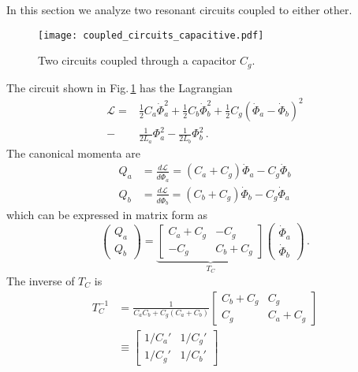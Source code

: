 
In this section we analyze two resonant circuits coupled to either other.


\begin{figure}
\begin{centering}
\texttt{[image: coupled\_circuits\_capacitive.pdf]}
\par\end{centering}
\caption{Two circuits coupled through a capacitor $C_g$.}
\label{Fig:coupledCircuits_capacitive}
\end{figure}

The circuit shown in Fig.\,\ref{Fig:coupledCircuits_capacitive} has the Lagrangian
\begin{align}
  \mathcal{L}
  =& \frac{1}{2}C_a\dot{\Phi}_a^2 + \frac{1}{2}C_b\dot{\Phi}_b^2
   + \frac{1}{2}C_g \left( \dot{\Phi}_a - \dot{\Phi}_b \right)^2 \nonumber \\
  -& \frac{1}{2L_a}\Phi_a^2 - \frac{1}{2L_b}\Phi_b^2 \, .
\end{align}
The canonical momenta are
\begin{align}
  Q_a &= \frac{d \mathcal{L}}{d\dot{\Phi}_a} = (C_a + C_g) \dot{\Phi}_a - C_g\dot{\Phi}_b \nonumber \\
  Q_b &= \frac{d \mathcal{L}}{d\dot{\Phi}_b} = (C_b + C_g) \dot{\Phi}_b - C_g\dot{\Phi}_a
\end{align}
which can be expressed in matrix form as
\begin{equation*}
  \left( \begin{array}{c} Q_a \\ Q_b \end{array} \right) =
  \underbrace{
    \left[ \begin{array}{cc} C_a + C_g & -C_g \\ -C_g & C_b + C_g \end{array} \right]}_{T_C}
  \left( \begin{array}{c} \dot{\Phi}_a \\ \dot{\Phi}_b \end{array} \right)
  \, .
\end{equation*}
The inverse of $T_C$ is
\begin{align}
  T_C^{-1}
  &= \frac{1}{C_a C_b + C_g (C_a + C_b)}
    \left[ \begin{array}{cc} C_b + C_g & C_g \\ C_g & C_a + C_g \end{array} \right] \nonumber \\
  &\equiv \left[
    \begin{array}{cc} 1/C_a' & 1/C_g' \\ 1/C_g' & 1/C_b' \end{array}
    \right]
\end{align}
